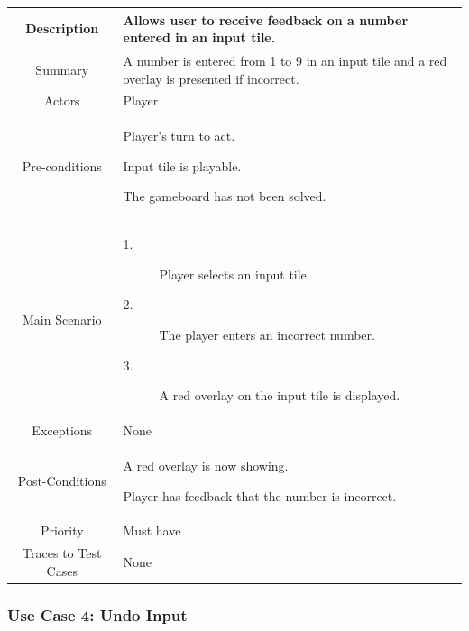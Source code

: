 \documentclass[12pt]{article}
\begin{document}
\begin{table}[htbp]
\begin{center}
\begin{tabular}{| c | m{10cm} |}
\hline
\cellcolor{lightgray}Description & Allows user to receive feedback on a number entered in an input tile. \\
\hline
\cellcolor{lightgray}Summary & A number is entered from 1 to 9 in an input tile and a red overlay is presented if incorrect. \\
\hline
\cellcolor{lightgray}Actors & Player \\
\hline
\cellcolor{lightgray}Pre-conditions &
\begin{description}[font=$\bullet$~\normalfont\scshape]
\item Player's turn to act.
\item Input tile is playable. 
\item The gameboard has not been solved.
\end{description}\\
\hline
\cellcolor{lightgray}Main Scenario & 
\begin{description}
\item [1.]Player selects an input tile.
\item [2.]The player enters an incorrect number. 
\item [3.]A red overlay on the input tile is displayed.
\end{description}\\
\hline
\cellcolor{lightgray}Exceptions & None \\
\hline
\cellcolor{lightgray}Post-Conditions & 
\begin{description}[font=$\bullet$~\normalfont\scshape]
\item A red overlay is now showing.
\item Player has feedback that the number is incorrect.
\end{description}\\
\hline
\cellcolor{lightgray}Priority & Must have \\
\hline
\cellcolor{lightgray}Traces to Test Cases & None \\
\hline
\end{tabular}
\end{center}
\end{table}

\newpage
\pagestyle{plain} 
\subsubsection{Use Case 4: Undo Input} \label{uc:2}
\end{document}
